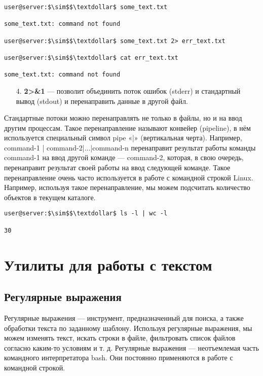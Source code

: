 \documentclass[14pt, a4paper]{article}
\begin{document}
\begin{lstlisting}
user@server:$\sim$$\textdollar$ some_text.txt

some_text.txt: command not found

user@server:$\sim$$\textdollar$ some_text.txt 2> err_text.txt

user@server:$\sim$$\textdollar$ cat err_text.txt

some_text.txt: command not found
\end{lstlisting}

\begin{enumerate}
    \item[4.] \textbf{2>\&1} — позволит объединить поток ошибок (stderr) и стандартный вывод (stdout) и
    перенаправить данные в другой файл.
\end{enumerate}

\noindent Стандартные потоки можно перенаправлять не только в файлы, но и на ввод другим процессам. Такое
перенаправление называют конвейер (pipeline), в нём используется специальный символ pipe «|»
(вертикальная черта). Например, \colorbox{backcolour}{command-1 | command-2|...|command-n} перенаправит результат
работы команды \colorbox{backcolour}{command-1} на ввод другой команде — \colorbox{backcolour}{command-2}, которая, в свою очередь,
перенаправит результат своей работы на ввод следующей команде. Такое перенаправление очень
часто используется в работе с командной строкой Linux. Например, используя такое
перенаправление, мы можем подсчитать количество объектов в текущем каталоге.

\vspace{0.5cm}

\begin{lstlisting}
user@server:$\sim$$\textdollar$ ls -l | wc -l

30
\end{lstlisting}

\section*{Утилиты для работы с текстом} 

\subsection*{Регулярные выражения} 

Регулярные выражения — инструмент, предназначенный для поиска, а также обработки текста по
заданному шаблону. Используя регулярные выражения, мы можем изменять текст, искать строки в
файле, фильтровать список файлов согласно каким-то условиям и т. д. Регулярные выражения —
неотъемлемая часть командного интерпретатора bash. Они постоянно применяются в работе с
командной строкой.\\
\end{document}

